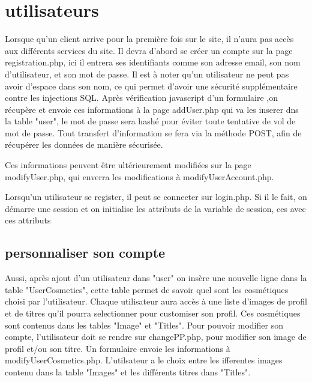 \section{utilisateurs}

Lorsque qu'un client arrive pour la première fois sur le site, il n'aura pas accès aux différents services du site. Il devra d'abord se créer un compte sur la page registration.php, ici il entrera ses 
identifiants comme son adresse email, son nom d'utilisateur, et son mot de passe.\newline
Il est à noter qu'un utilisateur ne peut pas avoir d'espace dans son nom, ce qui permet d'avoir une sécurité supplémentaire contre les injections SQL.\newline
Après vérification javascript d'un formulaire ,on récupère et envoie ces informations à la page addUser.php qui va les inserer dns la table "user", le mot de passe sera hashé pour éviter toute tentative de vol de mot de passe. Tout transfert d'information se fera via la méthode POST, afin de récupérer les données de manière sécurisée.
\newline

Ces informations peuvent être  ultérieurement modifiées sur la page modifyUser.php, qui enverra les modifications à modifyUserAccount.php.\newline

Lorsqu'un utilisateur se register, il peut se connecter sur login.php. Si il le fait, on démarre une session et on initialise les attributs de la variable de session, ces avec ces attributs 

\subsection{personnaliser son compte}

Aussi, après ajout d'un utilisateur dans "user" on insère une nouvelle ligne dans la table "UserCosmetics", cette table permet de savoir quel sont les cosmétiques choisi par l'utilisateur.  
Chaque utilisateur aura accès à une liste d'images de profil et de titres qu'il pourra selectionner pour customiser son profil. Ces cosmétiques sont contenus dans les tables "Image" et "Titles". 
\newline
Pour pouvoir modifier son compte, l'utilisateur doit se rendre sur changePP.php, pour modifier son image de profil et/ou son titre. Un formulaire envoie les informations à modifyUserCosmetics.php. L'utilsateur a le choix entre les ifferentes images contenu dans la table "Images" et les différents titres dans "Titles". \newline

